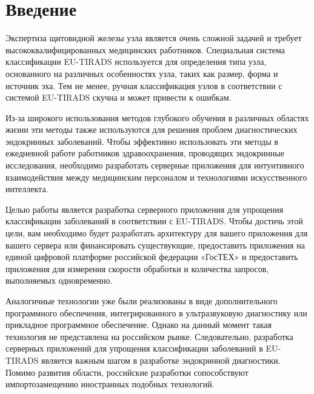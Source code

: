 \chapter*{Введение}
\label{sec:afterwords}

Экспертиза щитовидной железы узла является очень сложной задачей и требует высококвалифицированных медицинских работников. Специальная система классификации EU-TIRADS используется для определения типа узла, основанного на различных особенностях узла, таких как размер, форма и источник эха. Тем не менее, ручная классификация узлов в соответствии с системой EU-TIRADS скучна и может привести к ошибкам.


Из-за широкого использования методов глубокого обучения в различных областях жизни эти методы также используются для решения проблем диагностических эндокринных заболеваний. Чтобы эффективно использовать эти методы в ежедневной работе работников здравоохранения, проводящих эндокринные исследования, необходимо разработать серверные приложения для интуитивного взаимодействия между медицинским персоналом и технологиями искусственного интеллекта.


Целью работы является разработка серверного приложения для упрощения классификации заболеваний в соответствии с EU-TIRADS. Чтобы достичь этой цели, вам необходимо будет разработать архитектуру для вашего приложения для вашего сервера или финансировать существующие, предоставить приложения на единой цифровой платформе российской федерации «ГосТЕХ» и предоставить приложения для измерения скорости обработки и количества запросов, выполняемых одновременно.


Аналогичные технологии уже были реализованы в виде дополнительного программного обеспечения, интегрированного в ультразвуковую диагностику или прикладное программное обеспечение. Однако на данный момент такая технология не представлена ​​на российском рынке. Следовательно, разработка серверных приложений для упрощения классификации заболеваний в EU-TIRADS является важным шагом в разработке эндокринной диагностики. Помимо развития области, российские разработки сопособствуют импортозамещению иностранных подобных технологий.


